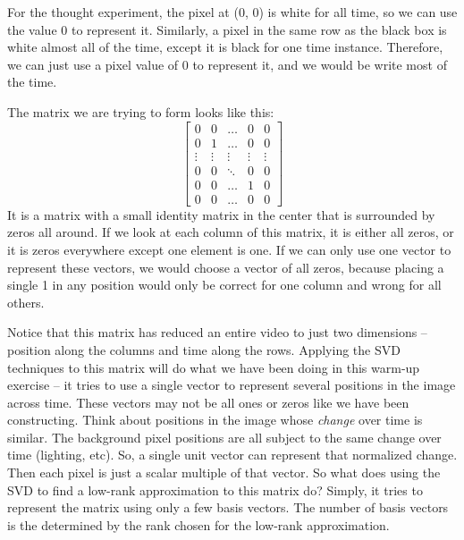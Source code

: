 For the thought experiment, the pixel at (0, 0) is white for all time, so we can use the value 0 to represent it. Similarly, a pixel in the same row as the black box is white almost all of the time, except it is black for one time instance. Therefore, we can just use a pixel value of 0 to represent it, and we would be write most of the time.

The matrix we are trying to form looks like this:
$$\left[\begin{matrix}
	0 & 0 & \ldots & 0 & 0 \\
	0 & 1 & \ldots & 0 & 0 \\
	\vdots & \vdots & \vdots & \vdots & \vdots \\
	0 & 0 & \ddots & 0 & 0 \\
	0 & 0 & \ldots & 1 & 0 \\
	0 & 0 & \ldots & 0 & 0
\end{matrix}\right]$$
It is a matrix with a small identity matrix in the center that is surrounded by zeros all around. If we look at each column of this matrix, it is either all zeros, or it is zeros everywhere except one element is one. If we can only use one vector to represent these vectors, we would choose a vector of all zeros, because placing a single 1 in any position would only be correct for one column and wrong for all others.

Notice that this matrix has reduced an entire video to just two dimensions -- position along the columns and time along the rows. Applying the SVD techniques to this matrix will do what we have been doing in this warm-up exercise -- it tries to use a single vector to represent several positions in the image across time. These vectors may not be all ones or zeros like we have been constructing. Think about positions in the image whose \textit{change} over time is similar. The background pixel positions are all subject to the same change over time (lighting, etc). So, a single unit vector can represent that normalized change. Then each pixel is just a scalar multiple of that vector. So what does using the SVD to find a low-rank approximation to this matrix do? Simply, it tries to represent the matrix using only a few basis vectors. The number of basis vectors is the determined by the rank chosen for the low-rank approximation.